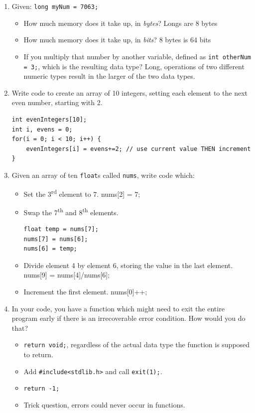 \documentclass[letter,11pt]{article}
\newcommand*\tick{\item[\Checkmark]}
\newcommand*\fail{\item[\XSolidBrush]}
\begin{document}
\begin{enumerate}
    \item Given: \texttt{long myNum = 7063;}
    \begin{itemize}
        \item How much memory does it take up, in \textit{bytes}? {\color{red}Longs are 8 bytes}
        \item How much memory does it take up, in \textit{bits}? {\color{red}8 bytes is 64 bits}
        \item If you multiply that number by another variable, defined as \texttt{int otherNum = 3;}, which is the resulting data type? {\color{red}Long, operations of two different numeric types result in the larger of the two data types.}
    \end{itemize}
    
    \item Write code to create an array of 10 integers, setting each element to the next even number, starting with 2.
    {
    \color{red}%
    \begin{verbatim}
int evenIntegers[10];
int i, evens = 0;
for(i = 0; i < 10; i++) {
    evenIntegers[i] = evens+=2; // use current value THEN increment
}
    \end{verbatim}
    }
    
    \item Given an array of ten \texttt{float}s called \texttt{nums}, write code which:
    \begin{itemize}
        \item Set the 3\textsuperscript{rd} element to 7. {\color{red}nums[2] = 7;}
        \item Swap the 7\textsuperscript{th} and 8\textsuperscript{th} elements.
        {
    \color{red}%
    \begin{verbatim}
float temp = nums[7];
nums[7] = nums[6];
nums[6] = temp;
    \end{verbatim}
    }
        \item Divide element 4 by element 6, storing the value in the last element. \\
        {\color{red} nums[9] = nums[4]/nums[6];}
        \item Increment the first element. {\color{red}nums[0]++;}
    \end{itemize}
    
    \item In your code, you have a function which might need to exit the entire program early if there is an irrecoverable error condition. How would you do that?
    \begin{itemize}
        \fail \texttt{return void;}, regardless of the actual data type the function is supposed to return.
        \tick Add \texttt{\#include<stdlib.h>} and call \texttt{exit(1);}.
        \fail \texttt{return -1;}
        \fail Trick question, errors could never occur in functions.
    \end{itemize}
    

\end{enumerate}
\end{document}
